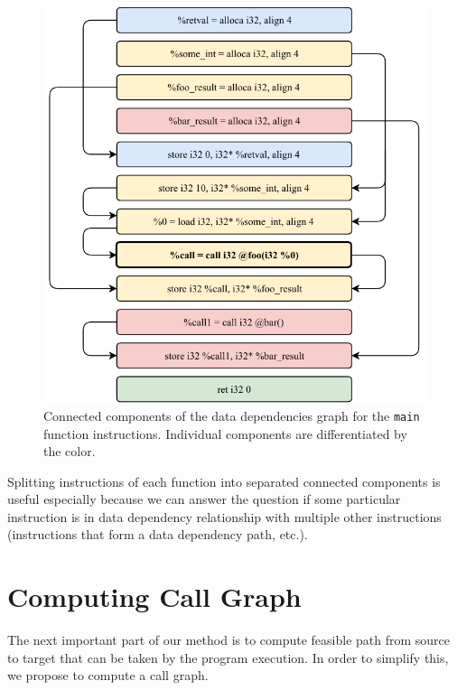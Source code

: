 \documentclass[12pt, twoside]{fithesis2}
\renewcommand{\_}{\leavevmode \kern0.07em\vbox{\hrule width0.4em}}
\begin{document}
\begin{figure}[ht]
    \centering
    \includegraphics[]{images/main_components.pdf}
    \caption{Connected components of the data dependencies graph
    for the \texttt{main} function instructions. Individual components
    are differentiated by the color.}
    \label{fig:connected_components_graph}
\end{figure}

Splitting instructions of each function into separated connected components
is useful especially because we can answer the question if some particular
instruction is in data dependency relationship with multiple other instructions
(instructions that form a data dependency path, etc.).

\section{Computing Call Graph}
\label{sec:design-callgraph}

The next important part of our method is to compute feasible path from source
to target that can be taken by the program execution.
In order to simplify this, we propose to compute a call graph.
\end{document}
